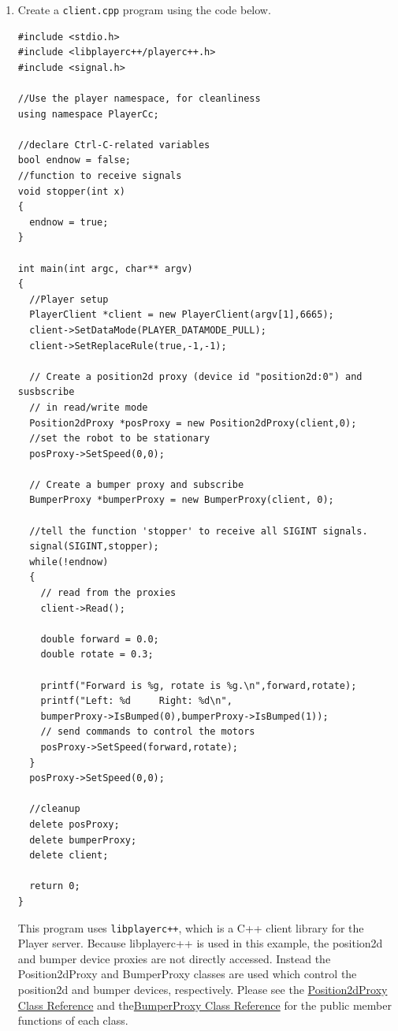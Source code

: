 \begin{enumerate}

\item \label{sec:3_create_client}Create a \texttt{client.cpp} program using the code below.

\begin{verbatim}
#include <stdio.h>
#include <libplayerc++/playerc++.h>
#include <signal.h>

//Use the player namespace, for cleanliness
using namespace PlayerCc;

//declare Ctrl-C-related variables
bool endnow = false;
//function to receive signals
void stopper(int x)
{
  endnow = true;
}

int main(int argc, char** argv)
{
  //Player setup
  PlayerClient *client = new PlayerClient(argv[1],6665);
  client->SetDataMode(PLAYER_DATAMODE_PULL);
  client->SetReplaceRule(true,-1,-1);

  // Create a position2d proxy (device id "position2d:0") and susbscribe
  // in read/write mode
  Position2dProxy *posProxy = new Position2dProxy(client,0);
  //set the robot to be stationary
  posProxy->SetSpeed(0,0);

  // Create a bumper proxy and subscribe
  BumperProxy *bumperProxy = new BumperProxy(client, 0);

  //tell the function 'stopper' to receive all SIGINT signals.
  signal(SIGINT,stopper);
  while(!endnow)
  {
    // read from the proxies
    client->Read();

    double forward = 0.0;
    double rotate = 0.3;
	
    printf("Forward is %g, rotate is %g.\n",forward,rotate);
    printf("Left: %d     Right: %d\n",
    bumperProxy->IsBumped(0),bumperProxy->IsBumped(1));
    // send commands to control the motors
    posProxy->SetSpeed(forward,rotate);
  }
  posProxy->SetSpeed(0,0);
		
  //cleanup
  delete posProxy;
  delete bumperProxy;		
  delete client;
		
  return 0;
}
\end{verbatim}

This program uses \texttt{libplayerc++}, which is a C++ client library for the Player server. Because libplayerc++ is used in this example, the position2d and bumper device proxies are not directly accessed. Instead the Position2dProxy and BumperProxy classes are used which control the position2d and bumper devices, respectively. Please see the \href{http://playerstage.sourceforge.net/doc/Player-cvs/player/classPlayerCc\_1\_1Position2dProxy.html}{Position2dProxy Class Reference} and the\href{http://playerstage.sourceforge.net/doc/Player-cvs/player/classPlayerCc\_1\_1BumperProxy.html}{BumperProxy Class Reference} for the public member functions of each class.


\end{enumerate}
